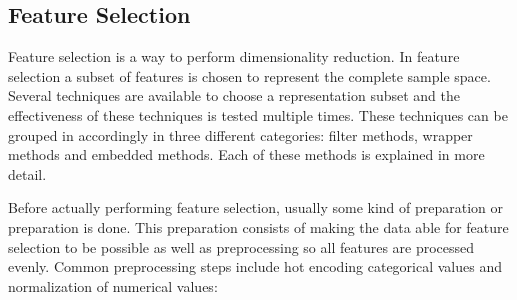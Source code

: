 \documentclass[10pt,a4paper]{article}
\begin{document}
	\subsection{Feature Selection}
	\label{subsec:FeatureSelection}
	
	Feature selection is a way to perform dimensionality reduction. In feature selection a subset of features is chosen to represent the complete sample space\cite{Guyon2006}. Several techniques are available to choose a representation subset and the effectiveness of these techniques is tested multiple times\cite{CATAL20091040, molina2002feature, chandrashekar2014survey}. These techniques can be grouped in accordingly in three different categories: filter methods, wrapper methods and embedded methods\cite{saeys2007review}. Each of these methods is explained in more detail.
	
	Before actually performing feature selection, usually some kind of preparation or preparation is done. This preparation consists of making the data able for feature selection to be possible as well as preprocessing so all features are processed evenly. Common preprocessing steps include hot encoding categorical values and normalization of numerical values:
	
\end{document}
